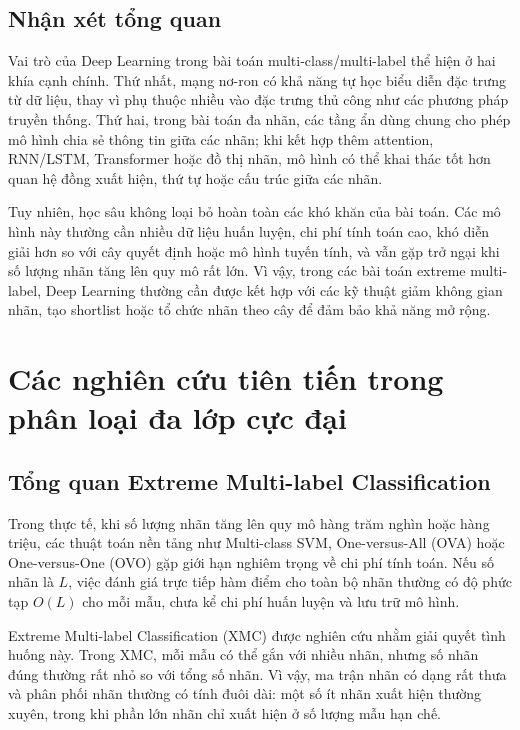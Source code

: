 \subsection{Nhận xét tổng quan}

Vai trò của Deep Learning trong bài toán multi-class/multi-label thể hiện ở hai khía cạnh chính. Thứ nhất, mạng nơ-ron có khả năng tự học biểu diễn đặc trưng từ dữ liệu, thay vì phụ thuộc nhiều vào đặc trưng thủ công như các phương pháp truyền thống. Thứ hai, trong bài toán đa nhãn, các tầng ẩn dùng chung cho phép mô hình chia sẻ thông tin giữa các nhãn; khi kết hợp thêm attention, RNN/LSTM, Transformer hoặc đồ thị nhãn, mô hình có thể khai thác tốt hơn quan hệ đồng xuất hiện, thứ tự hoặc cấu trúc giữa các nhãn.

Tuy nhiên, học sâu không loại bỏ hoàn toàn các khó khăn của bài toán. Các mô hình này thường cần nhiều dữ liệu huấn luyện, chi phí tính toán cao, khó diễn giải hơn so với cây quyết định hoặc mô hình tuyến tính, và vẫn gặp trở ngại khi số lượng nhãn tăng lên quy mô rất lớn. Vì vậy, trong các bài toán extreme multi-label, Deep Learning thường cần được kết hợp với các kỹ thuật giảm không gian nhãn, tạo shortlist hoặc tổ chức nhãn theo cây để đảm bảo khả năng mở rộng.

\section{Các nghiên cứu tiên tiến trong phân loại đa lớp cực đại}

\subsection{Tổng quan Extreme Multi-label Classification}

Trong thực tế, khi số lượng nhãn tăng lên quy mô hàng trăm nghìn hoặc hàng triệu, các thuật toán nền tảng như Multi-class SVM, One-versus-All (OVA) hoặc One-versus-One (OVO) gặp giới hạn nghiêm trọng về chi phí tính toán. Nếu số nhãn là $L$, việc đánh giá trực tiếp hàm điểm cho toàn bộ nhãn thường có độ phức tạp $O(L)$ cho mỗi mẫu, chưa kể chi phí huấn luyện và lưu trữ mô hình.

Extreme Multi-label Classification (XMC) được nghiên cứu nhằm giải quyết tình huống này. Trong XMC, mỗi mẫu có thể gắn với nhiều nhãn, nhưng số nhãn đúng thường rất nhỏ so với tổng số nhãn. Vì vậy, ma trận nhãn có dạng rất thưa và phân phối nhãn thường có tính đuôi dài: một số ít nhãn xuất hiện thường xuyên, trong khi phần lớn nhãn chỉ xuất hiện ở số lượng mẫu hạn chế.

